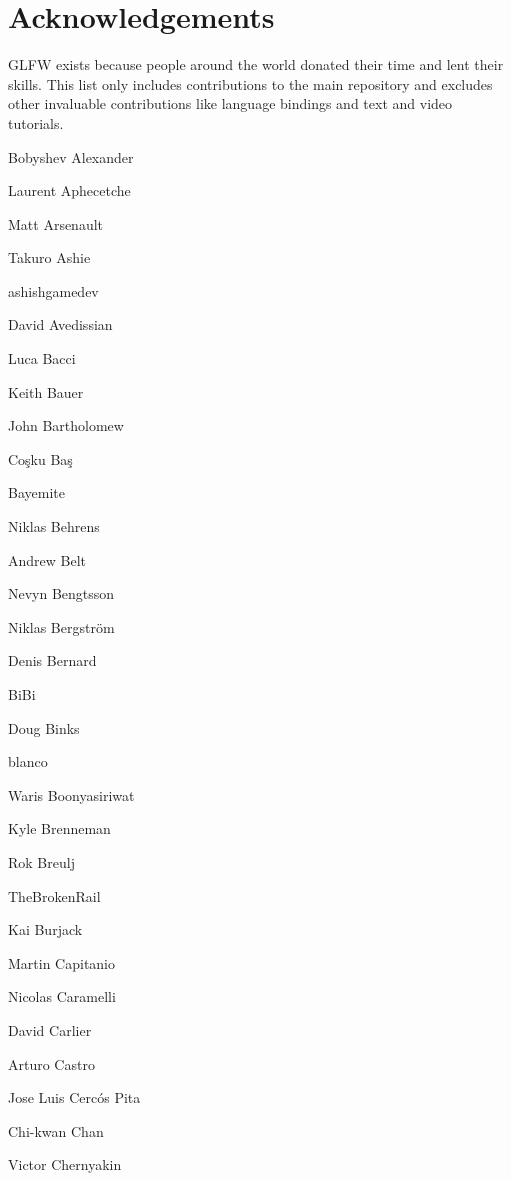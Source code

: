 \chapter{Acknowledgements}
\hypertarget{md_src_2glfw_2CONTRIBUTORS}{}\label{md_src_2glfw_2CONTRIBUTORS}
\label{md_src_2glfw_2CONTRIBUTORS_autotoc_md0}%
%
 GLFW exists because people around the world donated their time and lent their skills. This list only includes contributions to the main repository and excludes other invaluable contributions like language bindings and text and video tutorials.


\begin{DoxyItemize}
\item Bobyshev Alexander
\item Laurent Aphecetche
\item Matt Arsenault
\item Takuro Ashie
\item ashishgamedev
\item David Avedissian
\item Luca Bacci
\item Keith Bauer
\item John Bartholomew
\item Coşku Baş
\item Bayemite
\item Niklas Behrens
\item Andrew Belt
\item Nevyn Bengtsson
\item Niklas Bergström
\item Denis Bernard
\item Bi\+Bi
\item Doug Binks
\item blanco
\item Waris Boonyasiriwat
\item Kyle Brenneman
\item Rok Breulj
\item The\+Broken\+Rail
\item Kai Burjack
\item Martin Capitanio
\item Nicolas Caramelli
\item David Carlier
\item Arturo Castro
\item Jose Luis Cercós Pita
\item Chi-\/kwan Chan
\item Victor Chernyakin

\end{DoxyItemize}
